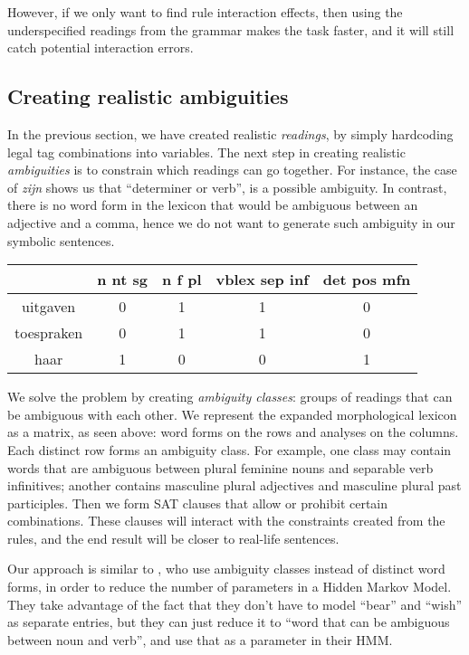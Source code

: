 However, if we only want to find rule interaction effects, then using
the underspecified readings from the grammar makes the task faster,
and it will still catch potential interaction errors.


\subsection{Creating realistic ambiguities}




In the previous section, we have created realistic \emph{readings}, by simply hardcoding legal tag combinations into variables. The next step in creating realistic \emph{ambiguities} is to constrain which readings can go together. For instance, the case of \emph{zijn} shows us that ``determiner or verb'', is a possible ambiguity. In contrast, there is no word form in the lexicon that would be ambiguous between an adjective and a comma, hence we do not want to generate such ambiguity in our symbolic sentences.

\begin{center}
\begin{tabular}{c|c|c|c|c}


            & n nt sg  & n f pl  & vblex sep inf & det pos mfn  \\ \hline
uitgaven    & 0        & 1       & 1             & 0    \\ 
toespraken  & 0        & 1       & 1             & 0    \\ 
haar        & 1        & 0       & 0             & 1    \\ 


\end{tabular}
\end{center}

We solve the problem by creating \emph{ambiguity classes}: groups of readings that can be ambiguous with each other. 
We represent the expanded morphological lexicon as a matrix, as seen
above: word forms on the rows and analyses on the columns. Each
distinct row forms an ambiguity class. For example, one class may
contain words that are ambiguous between plural feminine nouns and
separable verb infinitives; another contains masculine plural adjectives 
and masculine plural past participles.
Then we form SAT clauses that allow or prohibit certain combinations. These clauses will interact with the constraints created from the rules, and the end result will be closer to real-life sentences.

Our approach is similar to , who use ambiguity classes instead of distinct word forms, in order to reduce the number of parameters in a Hidden Markov Model. They take advantage of the fact that they don't have to model ``bear'' and ``wish'' as separate entries, but they can just reduce it to ``word that can be ambiguous between noun and verb'', and use that as a parameter in their HMM. 

